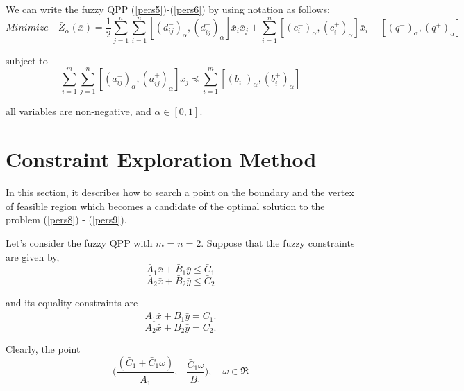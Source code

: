 \documentclass{iaesarticle3}
\begin{document}
We can write the fuzzy QPP (\ref{pers5})-(\ref{pers6}) by using notation \cite{kau} as follows:
\begin{equation}\label{pers8}
    Minimize \quad \bar{Z}_\alpha(\bar{x}) = \frac{1}{2} \sum_{j=1}^n \sum_{i=1}^n [(d_{ij}^-)_\alpha,  (d_{ij}^+)_\alpha]\bar{x}_i \bar{x}_j + \sum_{i=1}^n [(c_i^-)_\alpha, (c_i^+)_\alpha] \bar{x}_i + [(q^-)_\alpha, (q^+)_\alpha]
\end{equation}

subject to
\begin{equation}\label{pers9}
    \sum_{i=1}^m \sum_{j=1}^n [(a_{ij}^-)_\alpha, (a_{ij}^+)_\alpha] \bar{x}_j \preceq \sum_{i=1}^m [(b_i^-)_\alpha, (b_i^+)_\alpha]
\end{equation}

all variables are non-negative, and $\alpha \in [0,1]$.

\section{Constraint Exploration Method}

In this section, it describes how to search a point on the boundary and the vertex of feasible region which becomes a candidate of the optimal solution to the problem (\ref{pers8}) - (\ref{pers9}).

Let's consider the fuzzy QPP with $m = n = 2$. Suppose that the fuzzy constraints are given by,\\

\begin{equation}\label{pers10}
    \bar{A}_1\bar{x} + \bar{B}_1\bar{y} \leq \bar{C}_1
\end{equation}
\begin{equation}\label{pers11}
    \bar{A}_2\bar{x} + \bar{B}_2\bar{y} \leq \bar{C}_2
\end{equation}

and its equality constraints are \\
\begin{equation}\label{pers12}
    \bar{A}_1\bar{x} + \bar{B}_1\bar{y} = \bar{C}_1.
\end{equation}
\begin{equation}\label{pers13}
    \bar{A}_2\bar{x} + \bar{B}_2\bar{y} = \bar{C}_2.
\end{equation}

Clearly, the point
\begin{equation}\label{pers14}
    \bigg(\frac{(\bar{C}_1 + \bar{C}_1\omega)}{\bar{A}_1},-\frac{\bar{C}_1\omega}{\bar{B}_1}\bigg), \quad \omega \in \Re
\end{equation}
\end{document}
